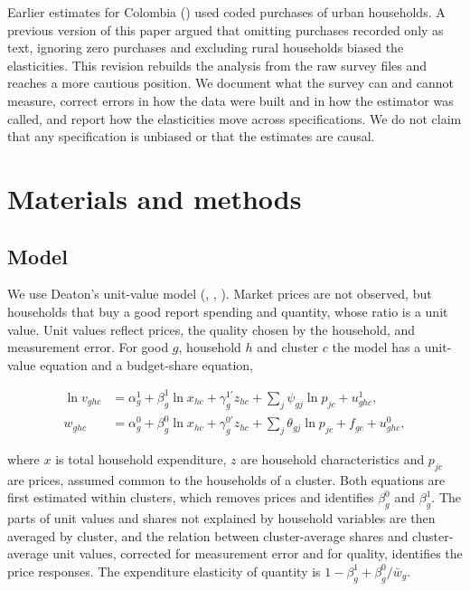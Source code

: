\documentclass[
  11pt,
]{article}
\begin{document}
Earlier estimates for Colombia
() used coded
purchases of urban households. A previous version of this paper argued
that omitting purchases recorded only as text, ignoring zero purchases
and excluding rural households biased the elasticities. This revision
rebuilds the analysis from the raw survey files and reaches a more
cautious position. We document what the survey can and cannot measure,
correct errors in how the data were built and in how the estimator was
called, and report how the elasticities move across specifications. We
do not claim that any specification is unbiased or that the estimates
are causal.

\section{Materials and methods}\label{materials-and-methods}

\subsection{Model}\label{model}

We use Deaton's unit-value model
(,
,
). Market prices are not
observed, but households that buy a good report spending and quantity,
whose ratio is a unit value. Unit values reflect prices, the quality
chosen by the household, and measurement error. For good \(g\),
household \(h\) and cluster \(c\) the model has a unit-value equation
and a budget-share equation,

\begin{align}
\ln v_{ghc} &= \alpha^1_g + \beta^1_g \ln x_{hc} + \gamma^{1\prime}_g z_{hc} + \sum_{j}\psi_{gj}\ln p_{jc} + u^1_{ghc}, \label{eq:uv}\\
w_{ghc} &= \alpha^0_g + \beta^0_g \ln x_{hc} + \gamma^{0\prime}_g z_{hc} + \sum_{j}\theta_{gj}\ln p_{jc} + f_{gc} + u^0_{ghc}, \label{eq:share}
\end{align}

where \(x\) is total household expenditure, \(z\) are household
characteristics and \(p_{jc}\) are prices, assumed common to the
households of a cluster. Both equations are first estimated within
clusters, which removes prices and identifies \(\beta^0_g\) and
\(\beta^1_g\). The parts of unit values and shares not explained by
household variables are then averaged by cluster, and the relation
between cluster-average shares and cluster-average unit values,
corrected for measurement error and for quality, identifies the price
responses. The expenditure elasticity of quantity is
\(1-\beta^1_g+\beta^0_g/\bar w_g\).
\end{document}
